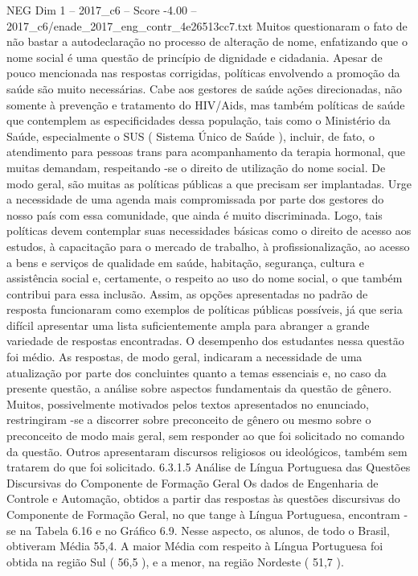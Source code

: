\begin{textsample}{NEG Dim 1 – 2017\_c6 – Score -4.00 – 2017\_c6/enade\_2017\_eng\_contr\_4e26513cc7.txt}
Muitos questionaram o fato de não bastar a autodeclaração no processo de alteração de nome, enfatizando que o nome social é uma questão de princípio de dignidade e cidadania.
Apesar de pouco mencionada nas respostas corrigidas, políticas envolvendo a promoção da saúde são muito necessárias.
Cabe aos gestores de saúde ações direcionadas, não somente à prevenção e tratamento do HIV/Aids, mas também políticas de saúde que contemplem as especificidades dessa população, tais como o Ministério da Saúde, especialmente o SUS ( Sistema Único de Saúde ), incluir, de fato, o atendimento para pessoas trans para acompanhamento da terapia hormonal, que muitas demandam, respeitando -se o direito de utilização do nome social.
De modo geral, são muitas as políticas públicas a que precisam ser implantadas.
Urge a necessidade de uma agenda mais compromissada por parte dos gestores do nosso país com essa comunidade, que ainda é muito discriminada.
Logo, tais políticas devem contemplar suas necessidades básicas como o direito de acesso aos estudos, à capacitação para o mercado de trabalho, à profissionalização, ao acesso a bens e serviços de qualidade em saúde, habitação, segurança, cultura e assistência social e, certamente, o respeito ao uso do nome social, o que também contribui para essa inclusão.
Assim, as opções apresentadas no padrão de resposta funcionaram como exemplos de políticas públicas possíveis, já que seria difícil apresentar uma lista suficientemente ampla para abranger a grande variedade de respostas encontradas.
O desempenho dos estudantes nessa questão foi médio.
As respostas, de modo geral, indicaram a necessidade de uma atualização por parte dos concluintes quanto a temas essenciais e, no caso da presente questão, a análise sobre aspectos fundamentais da questão de gênero.
Muitos, possivelmente motivados pelos textos apresentados no enunciado, restringiram -se a discorrer sobre preconceito de gênero ou mesmo sobre o preconceito de modo mais geral, sem responder ao que foi solicitado no comando da questão.
Outros apresentaram discursos religiosos ou ideológicos, também sem tratarem do que foi solicitado. 6.3.1.5 Análise de Língua Portuguesa das Questões Discursivas do Componente de Formação Geral Os dados de Engenharia de Controle e Automação, obtidos a partir das respostas às questões discursivas do Componente de Formação Geral, no que tange à Língua Portuguesa, encontram -se na Tabela 6.16 e no Gráfico 6.9.
Nesse aspecto, os alunos, de todo o Brasil, obtiveram Média 55,4.
A maior Média com respeito à Língua Portuguesa foi obtida na região Sul ( 56,5 ), e a menor, na região Nordeste ( 51,7 ).

\end{textsample}
